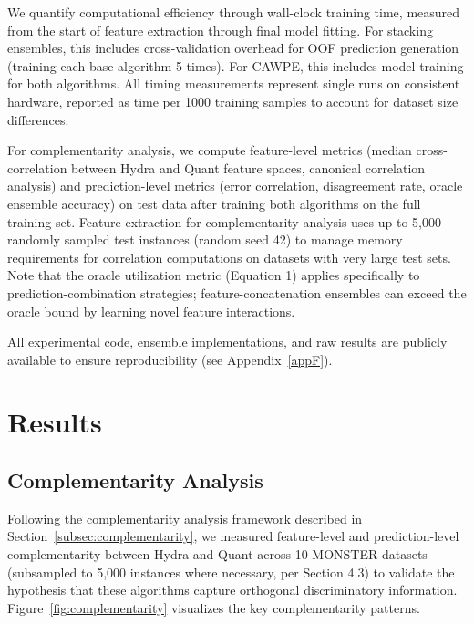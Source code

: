 \documentclass[pdflatex,sn-basic]{sn-jnl}           %
\theoremstyle{thmstyleone}%
\theoremstyle{thmstyletwo}%
\theoremstyle{thmstylethree}%
\begin{document}
We quantify computational efficiency through wall-clock training time, measured from the start of feature extraction through final model fitting. For stacking ensembles, this includes cross-validation overhead for OOF prediction generation (training each base algorithm 5 times). For CAWPE, this includes model training for both algorithms. All timing measurements represent single runs on consistent hardware, reported as time per 1000 training samples to account for dataset size differences.

For complementarity analysis, we compute feature-level metrics (median cross-correlation between Hydra and Quant feature spaces, canonical correlation analysis) and prediction-level metrics (error correlation, disagreement rate, oracle ensemble accuracy) on test data after training both algorithms on the full training set. Feature extraction for complementarity analysis uses up to 5,000 randomly sampled test instances (random seed 42) to manage memory requirements for correlation computations on datasets with very large test sets. Note that the oracle utilization metric (Equation 1) applies specifically to prediction-combination strategies; feature-concatenation ensembles can exceed the oracle bound by learning novel feature interactions.

All experimental code, ensemble implementations, and raw results are publicly available to ensure reproducibility (see Appendix~\ref{appF}).


\section{Results}\label{sec5}

\subsection{Complementarity Analysis}

Following the complementarity analysis framework described in Section~\ref{subsec:complementarity}, we measured feature-level and prediction-level complementarity between Hydra and Quant across 10 MONSTER datasets (subsampled to 5,000 instances where necessary, per Section 4.3) to validate the hypothesis that these algorithms capture orthogonal discriminatory information. Figure~\ref{fig:complementarity} visualizes the key complementarity patterns.
\end{document}
